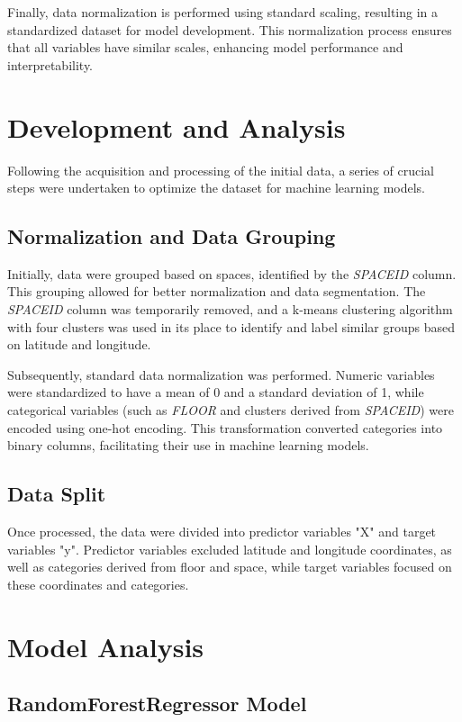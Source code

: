 \documentclass[conference]{IEEEtran}
\begin{document}
Finally, data normalization is performed using standard scaling, resulting in a standardized dataset for model development. This normalization process ensures that all variables have similar scales, enhancing model performance and interpretability.

\section{Development and Analysis}

Following the acquisition and processing of the initial data, a series of crucial steps were undertaken to optimize the dataset for machine learning models.

\subsection{Normalization and Data Grouping}

Initially, data were grouped based on spaces, identified by the \textit{SPACEID} column. This grouping allowed for better normalization and data segmentation. The \textit{SPACEID} column was temporarily removed, and a k-means clustering algorithm with four clusters was used in its place to identify and label similar groups based on latitude and longitude.

Subsequently, standard data normalization was performed. Numeric variables were standardized to have a mean of 0 and a standard deviation of 1, while categorical variables (such as \textit{FLOOR} and clusters derived from \textit{SPACEID}) were encoded using one-hot encoding. This transformation converted categories into binary columns, facilitating their use in machine learning models.

\subsection{Data Split}

Once processed, the data were divided into predictor variables "X" and target variables "y". Predictor variables excluded latitude and longitude coordinates, as well as categories derived from floor and space, while target variables focused on these coordinates and categories.

\section{Model Analysis}

\subsection{RandomForestRegressor Model}
\end{document}
